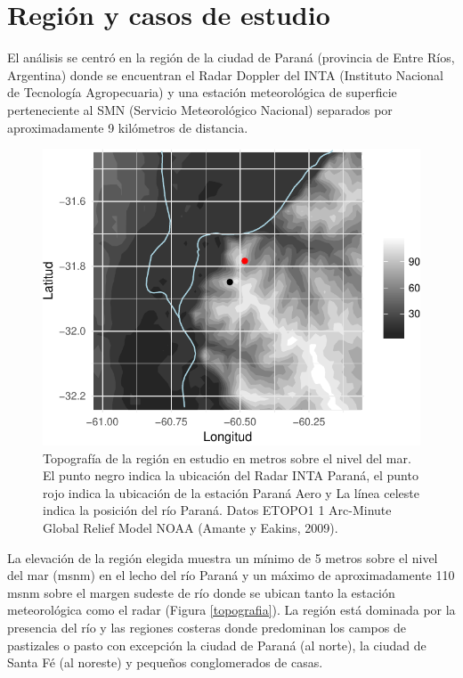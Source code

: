 \documentclass[12pt,spanish,oneside, a4paper]{book}
\begin{document}
\section{Región y casos de estudio}\label{region-y-casos-de-estudio}

El análisis se centró en la región de la ciudad de Paraná (provincia de
Entre Ríos, Argentina) donde se encuentran el Radar Doppler del INTA
(Instituto Nacional de Tecnología Agropecuaria) y una estación
meteorológica de superficie perteneciente al SMN (Servicio Meteorológico
Nacional) separados por aproximadamente 9 kilómetros de distancia.

\begin{figure}

{\centering \includegraphics{Tesis_files/figure-latex/topografia-1} 

}

\caption[Topografía de la región en estudio en metros sobre el nivel del mar.]{Topografía de la región en estudio en metros sobre el nivel del mar. El punto negro indica la ubicación del Radar INTA Paraná, el punto rojo indica la ubicación de la estación Paraná Aero y La línea celeste indica la posición del río Paraná. Datos ETOPO1 1 Arc-Minute Global Relief Model NOAA (Amante y Eakins, 2009). \label{topografia}}\label{fig:topografia}
\end{figure}

La elevación de la región elegida muestra un mínimo de 5 metros sobre el
nivel del mar (msnm) en el lecho del río Paraná y un máximo de
aproximadamente 110 msnm sobre el margen sudeste de río donde se ubican
tanto la estación meteorológica como el radar (Figura \ref{topografia}).
La región está dominada por la presencia del río y las regiones costeras
donde predominan los campos de pastizales o pasto con excepción la
ciudad de Paraná (al norte), la ciudad de Santa Fé (al noreste) y
pequeños conglomerados de casas.
\end{document}
